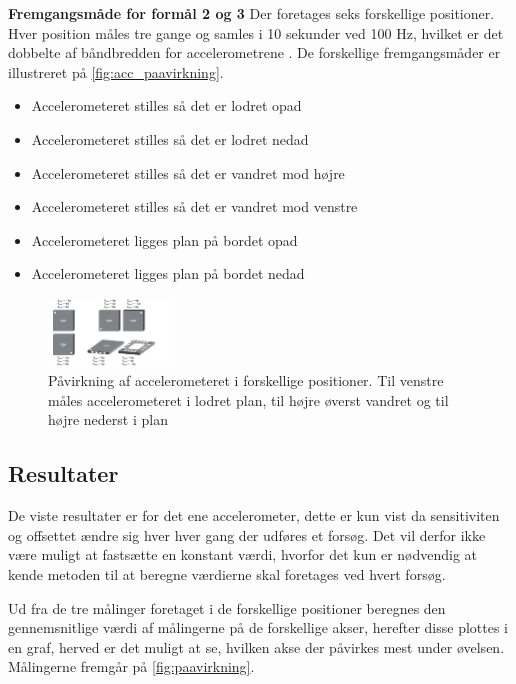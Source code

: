 \textbf{Fremgangsmåde for formål 2 og 3}\label{sec:acc_fremgangsmaade}
Der foretages seks forskellige positioner. Hver position måles tre gange og samles i 10 sekunder ved 100 Hz, hvilket er det dobbelte af båndbredden for accelerometrene \citep{analogdevices2010}. De forskellige fremgangsmåder er illustreret på \autoref{fig:acc_paavirkning}. 
\begin{itemize}
\item Accelerometeret stilles så det er lodret opad
\item Accelerometeret stilles så det er lodret nedad
\item Accelerometeret stilles så det er vandret mod højre
\item Accelerometeret stilles så det er vandret mod venstre
\item Accelerometeret ligges plan på bordet opad
\item Accelerometeret ligges plan på bordet nedad
\end{itemize}

\begin{figure}[H]
\centering
\includegraphics[width=0.3\textwidth]{figures/acc_paavirkning}
\caption{Påvirkning af accelerometeret i forskellige positioner. Til venstre måles accelerometeret i lodret plan, til højre øverst vandret og til højre nederst i plan \citep{analogdevices2010}}
\label{fig:acc_paavirkning}
\end{figure}

\subsection{Resultater} 
De viste resultater er for det ene accelerometer, dette er kun vist da sensitiviten og offsettet ændre sig hver hver gang der udføres et forsøg. Det vil derfor ikke være muligt at fastsætte en konstant værdi, hvorfor det kun er nødvendig at kende metoden til at beregne værdierne skal foretages ved hvert forsøg.

Ud fra de tre målinger foretaget i de forskellige positioner beregnes den gennemsnitlige værdi af målingerne på de forskellige akser, herefter disse plottes i en graf, herved er det muligt at se, hvilken akse der påvirkes mest under øvelsen. Målingerne fremgår på \autoref{fig:paavirkning}. 

